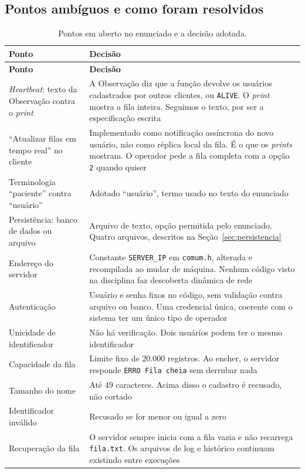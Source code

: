 \documentclass[12pt,a4paper]{article}
\begin{document}
\subsection{Pontos ambíguos e como foram resolvidos}

{\footnotesize
\begin{longtable}{L{4.6cm} L{8.6cm}}
\caption{Pontos em aberto no enunciado e a decisão adotada.}\\
\toprule
\textbf{Ponto} & \textbf{Decisão} \\
\midrule
\endfirsthead
\toprule
\textbf{Ponto} & \textbf{Decisão} \\
\midrule
\endhead
\textit{Heartbeat}: texto da Observação contra o \textit{print} &
A Observação diz que a função devolve os usuários cadastrados por outros
clientes, ou \texttt{ALIVE}. O \textit{print} mostra a fila inteira. Seguimos o
texto, por ser a especificação escrita \\
\addlinespace
``Atualizar filas em tempo real'' no cliente &
Implementado como notificação assíncrona do novo usuário, não como réplica local
da fila. É o que os \textit{prints} mostram. O operador pede a fila completa com
a opção \texttt{2} quando quiser \\
\addlinespace
Terminologia ``paciente'' contra ``usuário'' &
Adotado ``usuário'', termo usado no texto do enunciado \\
\addlinespace
Persistência: banco de dados ou arquivo &
Arquivo de texto, opção permitida pelo enunciado. Quatro arquivos, descritos na
Seção~\ref{sec:persistencia} \\
\addlinespace
Endereço do servidor &
Constante \texttt{SERVER\_IP} em \texttt{comum.h}, alterada e recompilada ao
mudar de máquina. Nenhum código visto na disciplina faz descoberta dinâmica de
rede \\
\addlinespace
Autenticação &
Usuário e senha fixos no código, sem validação contra arquivo ou banco. Uma
credencial única, coerente com o sistema ter um único tipo de operador \\
\addlinespace
Unicidade de identificador &
Não há verificação. Dois usuários podem ter o mesmo identificador \\
\addlinespace
Capacidade da fila &
Limite fixo de 20.000 registros. Ao encher, o servidor responde
\texttt{ERRO Fila cheia} sem derrubar nada \\
\addlinespace
Tamanho do nome &
Até 49 caracteres. Acima disso o cadastro é recusado, não cortado \\
\addlinespace
Identificador inválido &
Recusado se for menor ou igual a zero \\
\addlinespace
Recuperação da fila &
O servidor sempre inicia com a fila vazia e não recarrega \texttt{fila.txt}. Os
arquivos de log e histórico continuam existindo entre execuções \\
\bottomrule
\end{longtable}}
\end{document}
